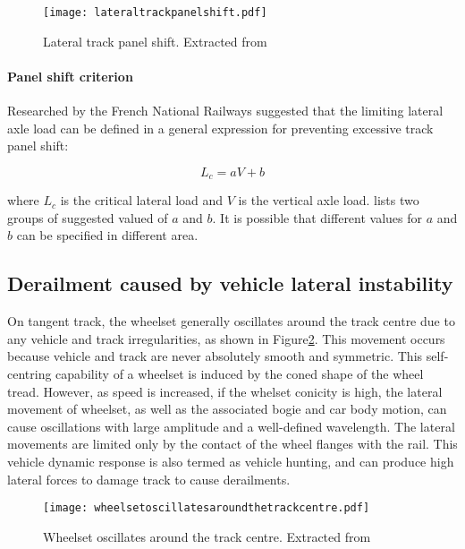 \begin{figure}[h]
    \centering
    \texttt{[image: lateraltrackpanelshift.pdf]}
    \caption{Lateral track panel shift. Extracted from \citet[Figure8.27]{iwnicki2006handbook}}
    \label{fig:lateraltrackpanelshift}
\end{figure}

\paragraph{Panel shift criterion}
Researched by the French National Railways suggested that the limiting lateral axle load can be defined in a general expression for preventing excessive track panel shift:

\begin{equation}
    L_c = aV+b
\end{equation}

where $L_c$ is the critical lateral load and $V$ is the vertical axle load. \citet[Table 8.2]{iwnicki2006handbook} lists two groups of suggested valued of $a$ and $b$. It is possible that different values for $a$ and $b$ can be specified in different area.

\subsection{Derailment caused by vehicle lateral instability}
On tangent track, the wheelset generally oscillates around the track centre due to any vehicle and track irregularities, as shown in Figure\ref{fig:wheelsetoscillatesaroundthetrackcentre}. This movement occurs because vehicle and track are never absolutely smooth and symmetric. This self-centring capability of a wheelset is induced by the coned shape of the wheel tread. However, as speed is increased, if the whelset conicity is high, the lateral movement of wheelset, as well as the associated bogie and car body motion, can cause oscillations with large amplitude  and a well-defined wavelength. The lateral movements are limited only by the contact of the wheel flanges with the rail. This vehicle dynamic response is also termed as vehicle hunting, and can produce high lateral forces to damage track to cause derailments.

\begin{figure}[h]
    \centering
    \texttt{[image: wheelsetoscillatesaroundthetrackcentre.pdf]}
    \caption{Wheelset oscillates around the track centre. Extracted from \citet[Figure8.28]{iwnicki2006handbook}}
    \label{fig:wheelsetoscillatesaroundthetrackcentre}
\end{figure}

